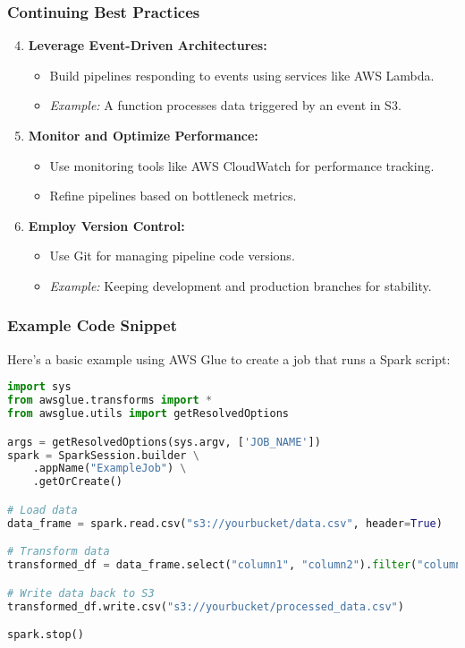 \documentclass{beamer}
\begin{document}
\begin{frame}[fragile]
    \frametitle{Continuing Best Practices}
    \begin{enumerate}
        \setcounter{enumi}{3}  %
        \item \textbf{Leverage Event-Driven Architectures:}
            \begin{itemize}
                \item Build pipelines responding to events using services like AWS Lambda.
                \item \textit{Example:} A function processes data triggered by an event in S3.
            \end{itemize}

        \item \textbf{Monitor and Optimize Performance:}
            \begin{itemize}
                \item Use monitoring tools like AWS CloudWatch for performance tracking.
                \item Refine pipelines based on bottleneck metrics.
            \end{itemize}

        \item \textbf{Employ Version Control:}
            \begin{itemize}
                \item Use Git for managing pipeline code versions.
                \item \textit{Example:} Keeping development and production branches for stability.
            \end{itemize}
    \end{enumerate}
\end{frame}

\begin{frame}[fragile]
    \frametitle{Example Code Snippet}
    Here’s a basic example using AWS Glue to create a job that runs a Spark script:
    \begin{lstlisting}[language=Python]
import sys
from awsglue.transforms import *
from awsglue.utils import getResolvedOptions

args = getResolvedOptions(sys.argv, ['JOB_NAME'])
spark = SparkSession.builder \
    .appName("ExampleJob") \
    .getOrCreate()

# Load data
data_frame = spark.read.csv("s3://yourbucket/data.csv", header=True)

# Transform data
transformed_df = data_frame.select("column1", "column2").filter("column1 IS NOT NULL")

# Write data back to S3
transformed_df.write.csv("s3://yourbucket/processed_data.csv")

spark.stop()
    \end{lstlisting}
\end{frame}
\end{document}
